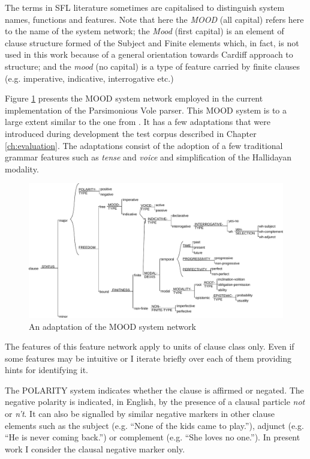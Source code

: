     The terms in SFL literature sometimes are capitalised to distinguish system names, functions and features. Note that here the \textit{MOOD} (all capital) refers here to the name of the system network; the \textit{Mood} (first capital) is an element of clause structure formed of the Subject and Finite elements which, in fact, is not used in this work because of a general orientation towards Cardiff approach to structure; and the \textit{mood} (no capital) is a type of feature carried by finite clauses (e.g. imperative, indicative, interrogative etc.)

    Figure \ref{fig:clause-mood} presents the MOOD system network employed in the current implementation of the Parsimonious Vole parser. This MOOD system is to a large extent similar to the one from \citet[162]{Halliday2013}. It has a few adaptations that were introduced during development the test corpus described in Chapter \ref{ch:evaluation}. The adaptations consist of the adoption of a few traditional grammar features such as \textit{tense} and \textit{voice} and simplification of the Hallidayan modality.
        
    \begin{figure}[!ht]
        \centering
        \includegraphics[width=\linewidth]{Figures/SFL-grammar/mood-simplified.pdf}
        \caption{An adaptation of the MOOD system network \citep[162]{Halliday2013}}
        \label{fig:clause-mood}
    \end{figure}

    The features of this feature network apply to units of clause class only. Even if some features may be intuitive or I iterate briefly over each of them providing hints for identifying it. 
    
    The POLARITY system indicates whether the clause is affirmed or negated. The negative polarity is indicated, in English, by the presence of a clausal particle \textit{not} or \textit{n't}. It can also be signalled by similar negative markers in other clause elements such as the subject (e.g. ``None of the kids came to play.''), adjunct (e.g. ``He is never coming back.'') or complement (e.g. ``She loves no one.''). In present work I consider the clausal negative marker only. 
    

